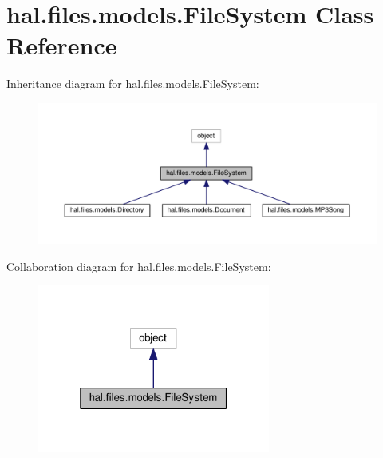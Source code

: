 \hypertarget{classhal_1_1files_1_1models_1_1_file_system}{}\section{hal.\+files.\+models.\+File\+System Class Reference}
\label{classhal_1_1files_1_1models_1_1_file_system}


Inheritance diagram for hal.\+files.\+models.\+File\+System\+:\nopagebreak
\begin{figure}[H]
\begin{center}
\leavevmode
\includegraphics[width=350pt]{classhal_1_1files_1_1models_1_1_file_system__inherit__graph}
\end{center}
\end{figure}


Collaboration diagram for hal.\+files.\+models.\+File\+System\+:\nopagebreak
\begin{figure}[H]
\begin{center}
\leavevmode
\includegraphics[width=217pt]{classhal_1_1files_1_1models_1_1_file_system__coll__graph}
\end{center}
\end{figure}
